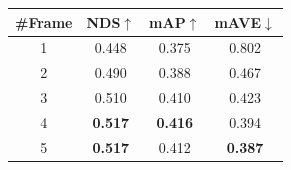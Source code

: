 \begin{tabular}[t]{c| c c c}
\toprule

\#Frame & NDS$\uparrow$ & mAP$\uparrow$ &mAVE$\downarrow$\\
\midrule
1 & 0.448 & 0.375 &0.802\\ 
2 & 0.490 &0.388 & 0.467\\
3 & 0.510 & 0.410 &0.423 \\
4 & \textbf{0.517} & \textbf{0.416} & 0.394\\
5 & \textbf{0.517} & 0.412 & \textbf{0.387}\\
\bottomrule
\end{tabular}